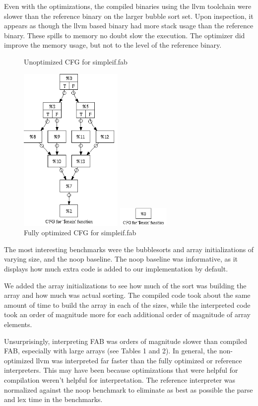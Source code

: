 \documentclass[11pt]{article} %
\begin{document}
Even with the optimizations, the compiled binaries using the llvm toolchain were slower than the reference binary on the larger bubble sort set. Upon inspection, it appears as though the llvm based binary had more stack usage than the reference binary. These spills to memory no doubt slow the execution. The optimizer did improve the memory usage, but not to the level of the reference binary.

\begin{figure}[h!]
\caption{Unoptimized CFG for simpleif.fab}
\centering
\includegraphics[width=50mm]{noOpt.png}
\caption{Fully optimized CFG for simpleif.fab}
\centering
\includegraphics[width=25mm]{fullOpt.png}
\end{figure}


The most interesting benchmarks were the bubblesorts and array initializations of varying size, and the noop baseline. The noop baseline was informative, as it displays how much extra code is added to our implementation by default. 

We added the array initializations to see how much of the sort was building the array and how much was actual sorting. The compiled code took about the same amount of time to build the array in each of the sizes, while the interpreted code took an order of magnitude more for each additional order of magnitude of array elements.

Unsurprisingly, interpreting FAB was orders of magnitude slower than compiled FAB, especially with large arrays (see Tables 1 and 2). In general, the non-optimized llvm was interpreted far faster than the fully optimized or reference interpreters. This may have been because optimizations that were helpful for compilation weren't helpful for interpretation. The reference interpreter was normalized against the noop benchmark to eliminate as best as possible the parse and lex time in the benchmarks.
\end{document}
